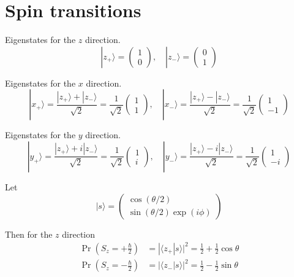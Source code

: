 

\section*{Spin transitions}

Eigenstates for the $z$ direction.
\begin{equation*}
|z_+\rangle=\begin{pmatrix}1\\0\end{pmatrix},
\quad
|z_-\rangle=\begin{pmatrix}0\\1\end{pmatrix}
\end{equation*}

Eigenstates for the $x$ direction.
\begin{equation*}
|x_+\rangle=\frac{|z_+\rangle+|z_-\rangle}{\sqrt2}=\frac{1}{\sqrt2}\begin{pmatrix}1\\1\end{pmatrix},
\quad
|x_-\rangle=\frac{|z_+\rangle-|z_-\rangle}{\sqrt2}=\frac{1}{\sqrt2}\begin{pmatrix}1\\-1\end{pmatrix}
\end{equation*}

Eigenstates for the $y$ direction.
\begin{equation*}
|y_+\rangle=\frac{|z_+\rangle+i|z_-\rangle}{\sqrt2}=\frac{1}{\sqrt2}\begin{pmatrix}1\\i\end{pmatrix},
\quad
|y_-\rangle=\frac{|z_+\rangle-i|z_-\rangle}{\sqrt2}=\frac{1}{\sqrt2}\begin{pmatrix}1\\-i\end{pmatrix}
\end{equation*}

Let
\begin{equation*}
|s\rangle=\begin{pmatrix}
\cos(\theta/2)
\\
\sin(\theta/2)\exp(i\phi)
\end{pmatrix}
\end{equation*}

Then for the $z$ direction
\begin{align*}
\Pr\left(S_z=+\tfrac{\hbar}{2}\right)&=|\langle z_+|s\rangle|^2=\tfrac{1}{2}+\tfrac{1}{2}\cos\theta
\\
\Pr\left(S_z=-\tfrac{\hbar}{2}\right)&=|\langle z_-|s\rangle|^2=\tfrac{1}{2}-\tfrac{1}{2}\sin\theta
\end{align*}

